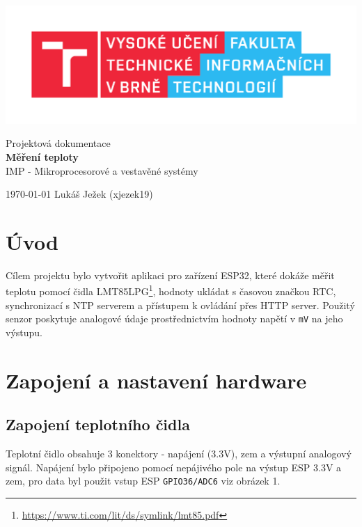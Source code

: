 \documentclass[a4paper, 11pt]{article}
\begin{document}
	\begin{titlepage}
		\begin{center}
			\includegraphics[width=0.77\linewidth]{FIT_logo.pdf} \\


			\Huge{Projektová dokumentace} \\
			\LARGE{\textbf{
				Měření teploty
			}} \\
			\Large{IMP - Mikroprocesorové a vestavěné systémy}

		\end{center}

		{\Large
			\today
			\hfill
			Lukáš Ježek (xjezek19)
		}
	\end{titlepage}



	\setcounter{page}{1}
	\tableofcontents
	\clearpage



	\setcounter{page}{1}

	\section{Úvod}

Cílem projektu bylo vytvořit aplikaci pro zařízení ESP32, které dokáže měřit teplotu pomocí čidla LMT85LPG\footnote{\url{https://www.ti.com/lit/ds/symlink/lmt85.pdf}}, hodnoty ukládat s časovou značkou RTC, synchronizací s NTP serverem a přístupem k ovládání přes HTTP server. Použitý senzor poskytuje analogové údaje prostřednictvím hodnoty napětí v \texttt{mV} na jeho výstupu.

\section{Zapojení a nastavení hardware}
 \subsection{Zapojení teplotního čidla}
 \label{temp_wiring}
 Teplotní čidlo obsahuje 3 konektory - napájení (3.3V), zem a výstupní analogový signál. Napájení bylo připojeno pomocí nepájivého pole na výstup ESP 3.3V a zem, pro data byl použit vstup ESP \texttt{GPIO36/ADC6} viz obrázek 1.
\end{document}
